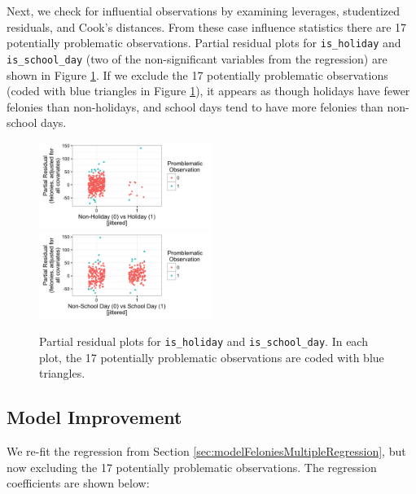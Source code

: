 \documentclass[11pt,notitlepage]{article}
\begin{document}
Next, we check for influential observations by examining leverages, studentized residuals, and Cook's distances. From these case influence statistics there are 17 potentially problematic observations. Partial residual plots for \texttt{is_holiday} and \texttt{is_school_day} (two of the non-significant variables from the regression) are shown in Figure \ref{fig:lm4Pres}. If we exclude the 17 potentially problematic observations (coded with blue triangles in Figure \ref{fig:lm4Pres}), it appears as though holidays have fewer felonies than non-holidays, and school days tend to have more felonies than non-school days.

\begin{figure}[!h]
  \centering
  \captionsetup{width=0.8\textwidth}
  \subfloat%
  		{\includegraphics[width=0.5\textwidth]
  		{figures/lm4PresIsHoliday.png}\label{fig:lm4PresIsHoliday}}
  \hfill
  \subfloat%
  		{\includegraphics[width=0.5\textwidth]
  		{figures/lm4PresIsSchoolDay.png}\label{fig:lm4PresIsSchoolDay}}
  \caption{Partial residual plots for \texttt{is_holiday} and \texttt{is_school_day}. In each plot, the 17 potentially problematic observations are coded with blue triangles.}
  \label{fig:lm4Pres}
\end{figure}



\subsection{Model Improvement}

We re-fit the regression from Section \ref{sec:modelFeloniesMultipleRegression}, but now excluding the 17 potentially problematic observations. The regression coefficients are shown below:
\end{document}
